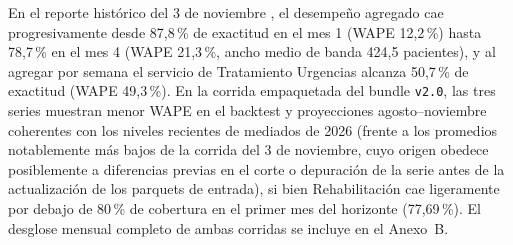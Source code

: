 En el reporte histórico del 3 de noviembre \parencite{mediflow2026largoplazo}, el desempeño agregado cae progresivamente desde 87,8\,\% de exactitud en el mes 1 (WAPE 12,2\,\%) hasta 78,7\,\% en el mes 4 (WAPE 21,3\,\%, ancho medio de banda 424,5 pacientes), y al agregar por semana el servicio de Tratamiento Urgencias alcanza 50,7\,\% de exactitud (WAPE 49,3\,\%). En la corrida empaquetada del bundle \texttt{v2.0}, las tres series muestran menor WAPE en el backtest y proyecciones agosto--noviembre coherentes con los niveles recientes de mediados de 2026 (frente a los promedios notablemente más bajos de la corrida del 3 de noviembre, cuyo origen obedece posiblemente a diferencias previas en el corte o depuración de la serie antes de la actualización de los parquets de entrada), si bien Rehabilitación cae ligeramente por debajo de 80\,\% de cobertura en el primer mes del horizonte (77,69\,\%). El desglose mensual completo de ambas corridas se incluye en el Anexo~B.
